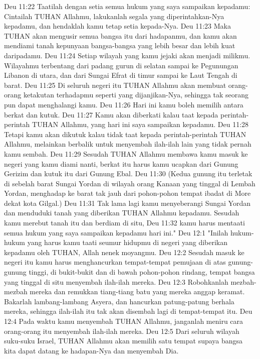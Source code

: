 Deu 11:22  Taatilah dengan setia semua hukum yang saya sampaikan kepadamu: Cintailah TUHAN Allahmu, lakukanlah segala yang diperintahkan-Nya kepadamu, dan hendaklah kamu tetap setia kepada-Nya.
Deu 11:23  Maka TUHAN akan mengusir semua bangsa itu dari hadapanmu, dan kamu akan mendiami tanah kepunyaan bangsa-bangsa yang lebih besar dan lebih kuat daripadamu.
Deu 11:24  Setiap wilayah yang kamu jejaki akan menjadi milikmu. Wilayahmu terbentang dari padang gurun di selatan sampai ke Pegunungan Libanon di utara, dan dari Sungai Efrat di timur sampai ke Laut Tengah di barat.
Deu 11:25  Di seluruh negeri itu TUHAN Allahmu akan membuat orang-orang ketakutan terhadapmu seperti yang dijanjikan-Nya, sehingga tak seorang pun dapat menghalangi kamu.
Deu 11:26  Hari ini kamu boleh memilih antara berkat dan kutuk.
Deu 11:27  Kamu akan diberkati kalau taat kepada perintah-perintah TUHAN Allahmu, yang hari ini saya sampaikan kepadamu.
Deu 11:28  Tetapi kamu akan dikutuk kalau tidak taat kepada perintah-perintah TUHAN Allahmu, melainkan berbalik untuk menyembah ilah-ilah lain yang tidak pernah kamu sembah.
Deu 11:29  Sesudah TUHAN Allahmu membawa kamu masuk ke negeri yang kamu diami nanti, berkat itu harus kamu ucapkan dari Gunung Gerizim dan kutuk itu dari Gunung Ebal.
Deu 11:30  (Kedua gunung itu terletak di sebelah barat Sungai Yordan di wilayah orang Kanaan yang tinggal di Lembah Yordan, menghadap ke barat tak jauh dari pohon-pohon tempat ibadat di More dekat kota Gilgal.)
Deu 11:31  Tak lama lagi kamu menyeberangi Sungai Yordan dan menduduki tanah yang diberikan TUHAN Allahmu kepadamu. Sesudah kamu merebut tanah itu dan berdiam di situ,
Deu 11:32  kamu harus mentaati semua hukum yang saya sampaikan kepadamu hari ini."
Deu 12:1  "Inilah hukum-hukum yang harus kamu taati seumur hidupmu di negeri yang diberikan kepadamu oleh TUHAN, Allah nenek moyangmu.
Deu 12:2  Sesudah masuk ke negeri itu kamu harus menghancurkan tempat-tempat pemujaan di atas gunung-gunung tinggi, di bukit-bukit dan di bawah pohon-pohon rindang, tempat bangsa yang tinggal di situ menyembah ilah-ilah mereka.
Deu 12:3  Robohkanlah mezbah-mezbah mereka dan remukkan tiang-tiang batu yang mereka anggap keramat. Bakarlah lambang-lambang Asyera, dan hancurkan patung-patung berhala mereka, sehingga ilah-ilah itu tak akan disembah lagi di tempat-tempat itu.
Deu 12:4  Pada waktu kamu menyembah TUHAN Allahmu, janganlah meniru cara orang-orang itu menyembah ilah-ilah mereka.
Deu 12:5  Dari seluruh wilayah suku-suku Israel, TUHAN Allahmu akan memilih satu tempat supaya bangsa kita dapat datang ke hadapan-Nya dan menyembah Dia.
